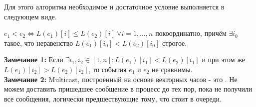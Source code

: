 Для этого алгоритма необходимое и достаточное условие выполняется в следующем виде.
\begin{theorem}
$e_1 < e_2 \Leftrightarrow L(e_1)[i] \leq L(e_2)[i]\ \forall i = 1,\ldots, n$ покоординатно, причём $\exists i_0$ такое, что неравенство $ L(e_1)[i_0] < L(e_2)[i_0]$ строгое.
\end{theorem}
\textbf{Замечание 1:} 
Если $\exists i_1, i_2 \in [1,n]: L(e_1)[i_1]< L(e_2)[i_1]$ и при этом же $L(e_1)[i_2] >  L(e_2)[i_2] $, то события $e_1$ и $e_2$ не сравнимы.
\\ 
\textbf{Замечание 2:} Multicast, построенный на основе векторных часов - это . Не можем доставить пришедшее сообщение в процесс до тех пор, пока не получили все сообщения, логически предшествующие тому, что стоит в  очереди.
